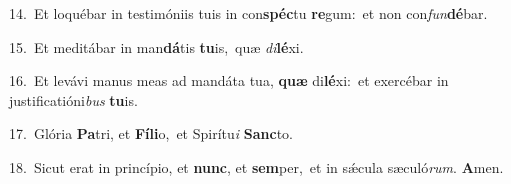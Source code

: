 {\numbfont\textcolor{\numbcolor}{14.}}~Et loquébar in testimóniis tuis in con\-\textbf{spéc}\-tu \textbf{re}\-gum:~\star et non con\-\textit{fun}\-\textbf{dé}bar.\par
{\numbfont\textcolor{\numbcolor}{15.}}~Et meditábar in man\-\textbf{dá}\-tis \textbf{tu}\-is,~\star quæ \textit{di}\-\textbf{lé}xi.\par
{\numbfont\textcolor{\numbcolor}{16.}}~Et levávi manus meas ad mandáta tua, \textbf{quæ} di\-\textbf{lé}\-xi:~\star et exercébar in justificatióni\textit{bus} \textbf{tu}\-is.\par
{\numbfont\textcolor{\numbcolor}{17.}}~Glória \textbf{Pa}\-tri, et \textbf{Fí}\-\textbf{li}o,~\star et Spirítu\textit{i} \textbf{Sanc}\-to.\par
{\numbfont\textcolor{\numbcolor}{18.}}~Sicut erat in princípio, et \textbf{nunc}\-, et \textbf{sem}\-per,~\star et in sǽcula sæculó\-\textit{rum}\-. \textbf{A}\-men.\par
